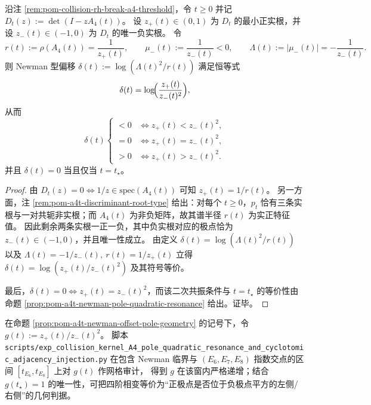 \begin{proposition}[核版 Newman 偏移的极点几何判据：\texorpdfstring{$\delta(t)=\log(z_+(t)/z_-(t)^2)$}{delta(t)=log(z+/z-^2)}]\label{prop:pom-a4t-newman-offset-pole-geometry}
沿注 \ref{rem:pom-collision-rh-break-a4-threshold}，令 \(t\ge 0\) 并记
\(
D_t(z):=\det(I-zA_4(t))
\)。
设 \(z_+(t)\in(0,1)\) 为 \(D_t\) 的最小正实根，并设 \(z_-(t)\in(-1,0)\) 为 \(D_t\) 的唯一负实根。
令
\[
r(t):=\rho(A_4(t))=\frac{1}{z_+(t)},\qquad
\mu_-(t):=\frac{1}{z_-(t)}<0,\qquad
\Lambda(t):=|\mu_-(t)|=-\frac{1}{z_-(t)}.
\]
则 Newman 型偏移 \(\delta(t):=\log(\Lambda(t)^2/r(t))\) 满足恒等式
\[
\delta(t)=\log\!\Bigl(\frac{z_+(t)}{z_-(t)^2}\Bigr),
\]
从而
\[
\delta(t)\begin{cases}
<0 &\Longleftrightarrow z_+(t)<z_-(t)^2,\\
=0 &\Longleftrightarrow z_+(t)=z_-(t)^2,\\
>0 &\Longleftrightarrow z_+(t)>z_-(t)^2.
\end{cases}
\]
并且 \(\delta(t)=0\) 当且仅当 \(t=t_\star\)。
\end{proposition}
\begin{proof}
由 \(D_t(z)=0\iff 1/z\in\mathrm{spec}(A_4(t))\) 可知 \(z_+(t)=1/r(t)\)。
另一方面，注 \ref{rem:pom-a4t-discriminant-root-type} 给出：对每个 \(t\ge 0\)，\(p_t\) 恰有三条实根与一对共轭非实根；而 \(A_4(t)\) 为非负矩阵，故其谱半径 \(r(t)\) 为实正特征值。
因此剩余两条实根一正一负，其中负实根对应的极点恰为 \(z_-(t)\in(-1,0)\)，并且唯一性成立。
由定义
\(
\delta(t)=\log(\Lambda(t)^2/r(t))
\)
以及
\(
\Lambda(t)=-1/z_-(t),\ r(t)=1/z_+(t)
\)
立得 \(\delta(t)=\log(z_+(t)/z_-(t)^2)\) 及其符号等价。
\par
最后，\(\delta(t)=0\iff z_+(t)=z_-(t)^2\)，而该二次共振条件与 \(t=t_\star\) 的等价性由命题 \ref{prop:pom-a4t-newman-pole-quadratic-resonance} 给出。证毕。
\end{proof}

\begin{remark}\label{rem:pom-a4t-pole-ratio-monotone-window}
在命题 \ref{prop:pom-a4t-newman-offset-pole-geometry} 的记号下，令
\(
g(t):=z_+(t)/z_-(t)^2
\)。
脚本 \texttt{scripts/exp\_collision\_kernel\_A4\_pole\_quadratic\_resonance\_and\_cyclotomic\_adjacency\_injection.py}
在包含 Newman 临界与 \((E_6,E_7,E_8)\) 指数交点的区间 \([t_{E_6},t_{E_8}]\) 上对 \(g(t)\) 作网格审计，
得到 \(g\) 在该窗内严格递增；结合 \(g(t_\star)=1\) 的唯一性，可把四阶相变等价为“正极点是否位于负极点平方的左侧/右侧”的几何判据。
\end{remark}

